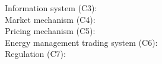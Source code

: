 \begin{description}
    \item[Information system (C3):]
    
    
    \item[Market mechanism (C4):] 
    
    
    \item[Pricing mechanism (C5):]
    
    
    \item[Energy management trading system (C6):] 
    
    
    \item[Regulation (C7):] 
\end{description}

\begin{comment}
    # Mengelkamp \shortcite{mengelkamp2018designing}
    
    An exemplary microgrid energy market scenario of residential consumers and 
    prosumers (consumers with photovoltaic (PV) systems) is shown in Fig. 2. 

\end{comment}

\clearpage